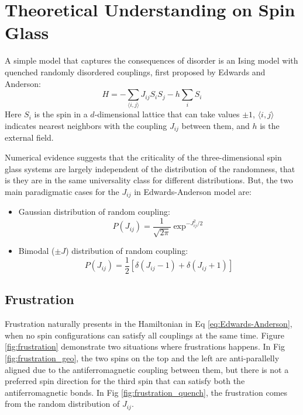 \section{Theoretical Understanding on Spin Glass}
A simple model that captures the consequences of disorder is an Ising model 
with quenched randomly disordered couplings, first proposed by Edwards and 
Anderson\cite{Edwards-Anderson1975}:
\begin{equation}
  \label{eq:Edwards-Anderson}
  H=-\sum_{\langle i,j \rangle}J_{ij}S_iS_j-h\sum_iS_i
\end{equation}
Here $S_i$ is the spin in a $d$-dimensional lattice that can take values $\pm 1$,
$\langle i,j \rangle$ indicates nearest neighbors with the coupling $J_{ij}$ between 
them, and $h$ is the external field.
 
Numerical evidence suggests that the criticality of the three-dimensional
spin glass systems are largely independent of the distribution of the randomness,
that is they are in the same universality class for different distributions. 
But, the two main paradigmatic cases for the $J_{ij}$ in Edwards-Anderson model are:
\begin{itemize}
\item Gaussian distribution of random coupling:
  \begin{equation}
    \label{eq:Jij_Gaussian}
    P(J_{ij})=\frac{1}{\sqrt{2\pi}}\exp^{-J_{ij}^2/2}
  \end{equation}
\item Bimodal ($\pm J$) distribution of random coupling:
  \begin{equation}
    \label{eq:Jij_bimodal}
    P(J_{ij})=\frac{1}{2}[\delta(J_{ij}-1)+\delta(J_{ij}+1)]
  \end{equation}
\end{itemize}

\subsection{Frustration}
\label{sec:frustration}
Frustration naturally presents in the Hamiltonian in Eq \ref{eq:Edwards-Anderson}, when no spin 
configurations can satisfy all couplings at the same time. 
Figure \ref{fig:frustration} demonstrate two situations where frustrations 
happens. In Fig \ref{fig:frustration_geo}, the two spins on the top and the left
are anti-parallelly aligned due to the antiferromagnetic coupling between them,
but there is not a preferred spin direction for the third spin that can satisfy
both the antiferromagnetic bonds. In Fig \ref{fig:frustration_quench}, the 
frustration comes from the random distribution of $J_{ij}$. 

